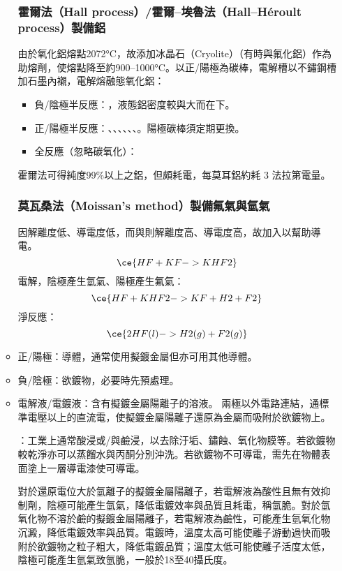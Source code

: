 \documentclass[a4paper,12pt]{report}
\begin{document}
\begin{itemize}
\begin{itemize}
\subsubsection{霍爾法（Hall process）/霍爾–埃魯法（Hall–Héroult process）製備鋁}
由於氧化鋁熔點2072°C，故添加冰晶石（Cryolite）（有時與氟化鋁）作為助熔劑，使熔點降至約900–1000°C。以正/陽極為碳棒，電解槽以不鏽鋼槽加石墨內襯，電解熔融態氧化鋁：
\begin{itemize}
\item 負/陰極半反應：，液態鋁密度較與大而在下。
\item 正/陽極半反應：、、、、、、。陽極碳棒須定期更換。
\item 全反應（忽略碳氧化）：
\end{itemize}
霍爾法可得純度99\%以上之鋁，但頗耗電，每莫耳鋁約耗 3 法拉第電量。
\subsubsection{莫瓦桑法（Moissan's method）製備氟氣與氫氣}
因解離度低、導電度低，而與則解離度高、導電度高，故加入以幫助導電。
\[\ce{HF + KF -> KHF2}\]
電解，陰極產生氫氣、陽極產生氟氣：
\[\ce{HF + KHF2 -> KF + H2 + F2}\]
淨反應：
\[\ce{2HF(l) -> H2(g) + F2(g)}\]
\bit
\item 正/陽極：導體，通常使用擬鍍金屬但亦可用其他導體。
\item 負/陰極：欲鍍物，必要時先預處理。
\item 電解液/電鍍液：含有擬鍍金屬陽離子的溶液。
\eit
兩極以外電路連結，通標準電壓以上的直流電，使擬鍍金屬陽離子還原為金屬而吸附於欲鍍物上。

：工業上通常酸浸或/與鹼浸，以去除汙垢、鏽蝕、氧化物膜等。若欲鍍物較乾淨亦可以蒸餾水與丙酮分別沖洗。若欲鍍物不可導電，需先在物體表面塗上一層導電漆使可導電。

對於還原電位大於氫離子的擬鍍金屬陽離子，若電解液為酸性且無有效抑制劑，陰極可能產生氫氣，降低電鍍效率與品質且耗電，稱氫脆。對於氫氧化物不溶於鹼的擬鍍金屬陽離子，若電解液為鹼性，可能產生氫氧化物沉澱，降低電鍍效率與品質。電鍍時，溫度太高可能使離子游動過快而吸附於欲鍍物之粒子粗大，降低電鍍品質；溫度太低可能使離子活度太低，陰極可能產生氫氣致氫脆，一般於18至40攝氏度。


\end{itemize}
\end{itemize}
\end{document}
